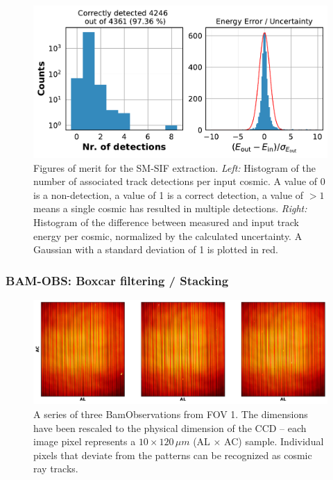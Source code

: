 \documentclass[a4paper, 11pt]{article}
\begin{document}
\begin{figure}
  \centering
  \includegraphics[width=\textwidth]{images/extraction/verification_sm-sif}
    \caption{Figures of merit for the SM-SIF extraction. \textit{Left:} Histogram of the number of associated track detections per input cosmic. A value of 0 is a non-detection, a value of 1 is a correct detection, a value of $>\!1$ means a single cosmic has resulted in multiple detections. \textit{Right:} Histogram of the difference between measured and input track energy per cosmic, normalized by the calculated uncertainty. A Gaussian with a standard deviation of 1 is plotted in red.}
  \label{fig:SM_extr_verif}
\end{figure}


\subsubsection{BAM-OBS: Boxcar filtering / Stacking}
\label{sec:extrBAM-OBS}
\begin{figure}
  \centering
  \includegraphics[width=\textwidth]{images/extraction/BAM-OBS_patterns}
  \caption{A series of three BamObservations from FOV 1. The dimensions have been rescaled to the physical dimension of the CCD -- each image pixel represents a $10 \times 120\, \mu m$ (AL $\times$ AC) sample. Individual pixels that deviate from the patterns can be recognized as cosmic ray tracks.}
  \label{fig:BAM_patterns}
\end{figure}
\end{document}
